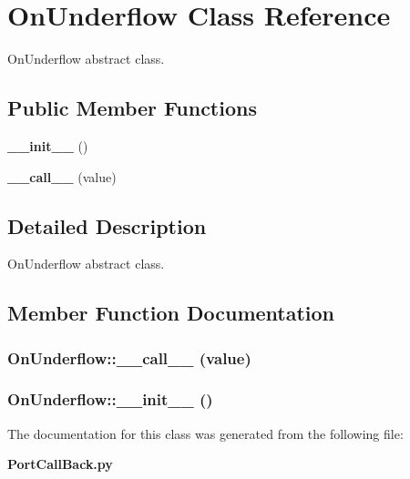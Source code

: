 \section{On\-Underflow Class Reference}
\label{classOnUnderflow}
On\-Underflow abstract class.  


\subsection*{Public Member Functions}
\begin{CompactItemize}
\item 
{\bf \_\-\_\-init\_\-\_\-} ()
\item 
{\bf \_\-\_\-call\_\-\_\-} (value)
\end{CompactItemize}


\subsection{Detailed Description}
On\-Underflow abstract class. 



\subsection{Member Function Documentation}
\subsubsection{\setlength{\rightskip}{0pt plus 5cm}On\-Underflow::\_\-\_\-call\_\-\_\- (value)}\label{classOnUnderflow_OnUnderflowa1}


\subsubsection{\setlength{\rightskip}{0pt plus 5cm}On\-Underflow::\_\-\_\-init\_\-\_\- ()}\label{classOnUnderflow_OnUnderflowa0}




The documentation for this class was generated from the following file:\begin{CompactItemize}
\item 
{\bf Port\-Call\-Back.py}\end{CompactItemize}
